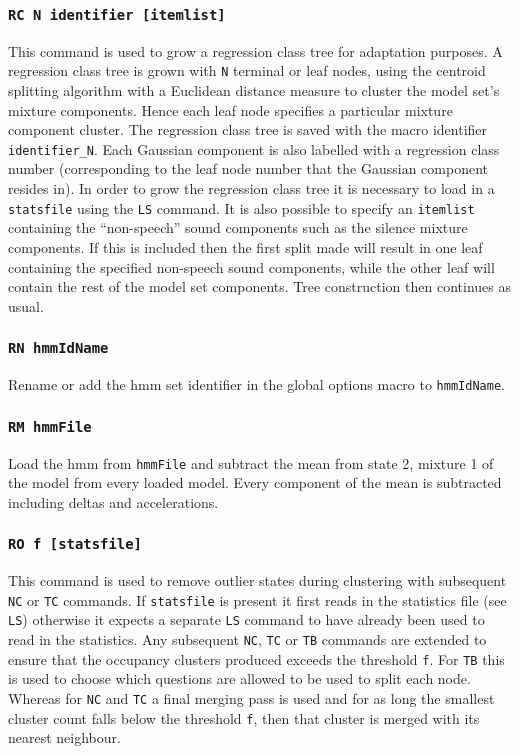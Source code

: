 \subsubsection*{\tt RC N identifier [itemlist]}

This command is used to grow a regression class tree for adaptation
purposes. A regression class tree is grown with
\texttt{N} terminal or leaf nodes, using the centroid splitting algorithm
with a Euclidean distance measure to cluster the model set's mixture
components. Hence each leaf node specifies a particular mixture
component cluster. The regression class tree is saved with the macro
identifier \texttt{identifier\_N}. Each Gaussian component is also
labelled with a regression class number (corresponding to the leaf
node number that the Gaussian component resides in). In order to grow
the regression class tree it is necessary to load in a \texttt{statsfile}
using the \texttt{LS} command. It is also possible to specify an
\texttt{itemlist} containing the ``non-speech'' sound components 
such as the silence mixture components. If this is included then the
first split made will result in one leaf containing the specified
non-speech sound components, while the other leaf will contain the
rest of the model set components. Tree construction then continues as usual.

\subsubsection*{\tt RN hmmIdName}

Rename or add the hmm set identifier in the global options macro to 
{\tt hmmIdName}.

\subsubsection*{\tt RM hmmFile}

Load the hmm from \texttt{hmmFile} and subtract the mean from state 2,
mixture 1 of the model from every loaded model.  Every component
of the mean is subtracted including deltas and accelerations.

\subsubsection*{\tt RO f [statsfile]}

This command is used to remove outlier states during clustering
with subsequent \texttt{NC} or \texttt{TC} commands.
If \texttt{statsfile} is present it first reads in the  statistics 
file (see \texttt{LS}) otherwise it expects a separate \texttt{LS} command
to have already been used to read in the statistics.
Any subsequent \texttt{NC}, \texttt{TC} or \texttt{TB} commands are
extended to ensure that the occupancy clusters produced exceeds the 
threshold \texttt{f}.
For \texttt{TB} this is used to choose which questions are allowed to
be used to split each node.   Whereas for \texttt{NC} and \texttt{TC} 
a final merging pass is used and for as long the smallest cluster count 
falls below the threshold \texttt{f}, then that cluster is merged with 
its nearest neighbour.

